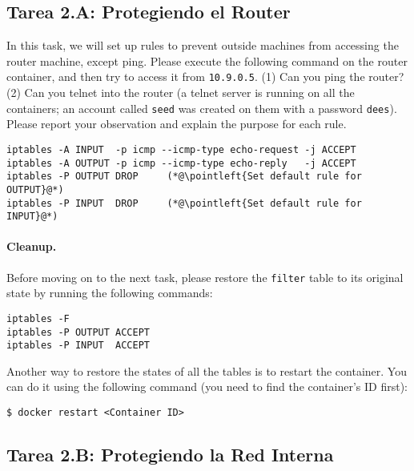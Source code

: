 \subsection{Tarea 2.A: Protegiendo el Router} 

In this task, we will set up rules to prevent outside machines from 
accessing the router machine, except ping.   
Please execute the following \iptables
command on the router container, and then try to 
access it from \texttt{10.9.0.5}. (1) Can you ping 
the router? (2) Can you telnet into the router (a 
telnet server is running on all the containers; an
account called \texttt{seed} was created on them with
a password \texttt{dees}). 
Please report your observation and explain the purpose for 
each rule. 

\begin{lstlisting}
iptables -A INPUT  -p icmp --icmp-type echo-request -j ACCEPT
iptables -A OUTPUT -p icmp --icmp-type echo-reply   -j ACCEPT
iptables -P OUTPUT DROP     (*@\pointleft{Set default rule for OUTPUT}@*)
iptables -P INPUT  DROP     (*@\pointleft{Set default rule for INPUT}@*)
\end{lstlisting}
 

\paragraph{Cleanup.} 
Before moving on to the next task, please restore the \texttt{filter} 
table to its original state by running the following commands:

\begin{lstlisting}
iptables -F
iptables -P OUTPUT ACCEPT
iptables -P INPUT  ACCEPT
\end{lstlisting}
 
Another way to restore the states of all the tables is to restart the 
container. You can do it using the following command (you need 
to find the container's ID first):

\begin{lstlisting}
$ docker restart <Container ID>
\end{lstlisting}
 


\subsection{Tarea 2.B: Protegiendo la Red Interna} 

